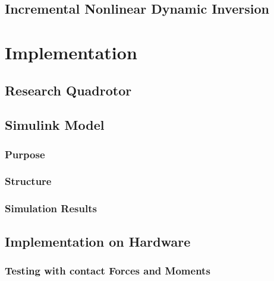 \documentclass[11pt, a4paper, twoside]{report}
\begin{document}
\section{Incremental Nonlinear Dynamic Inversion} \label{sec:indi}

\thispagestyle{fancy}



\chapter{Implementation} \label{cha:implementation}

\thispagestyle{fancy}

\section{Research Quadrotor} \label{sec:research_quadrotor}

\section{Simulink Model} \label{sec:simulink_model}

\subsection{Purpose} \label{subsec:purpose}

\subsection{Structure} \label{subsec:Structure}

\subsection{Simulation Results} \label{subsec:simulation_results}

\section{Implementation on Hardware} \label{sec:implementation_on_hardware}

\subsection{Testing with contact Forces and Moments} \label{subsec:testing_with_fandm}
\end{document}
